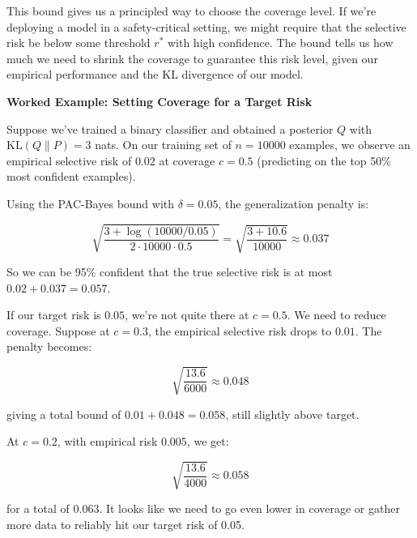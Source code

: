 \vspace{0.3cm}

This bound gives us a principled way to choose the coverage level. If we're deploying a model in a safety-critical setting, we might require that the selective risk be below some threshold $r^*$ with high confidence. The bound tells us how much we need to shrink the coverage to guarantee this risk level, given our empirical performance and the KL divergence of our model.

\vspace{1em}

\begin{examplebox}
\textbf{Worked Example: Setting Coverage for a Target Risk}

Suppose we've trained a binary classifier and obtained a posterior $Q$ with $\text{KL}(Q \| P) = 3$ nats. On our training set of $n=10000$ examples, we observe an empirical selective risk of $0.02$ at coverage $c=0.5$ (predicting on the top 50\% most confident examples).

Using the PAC-Bayes bound with $\delta = 0.05$, the generalization penalty is:

\begin{equation}
\sqrt{\frac{3 + \log(10000/0.05)}{2 \cdot 10000 \cdot 0.5}} = \sqrt{\frac{3 + 10.6}{10000}} \approx 0.037
\end{equation}

So we can be 95\% confident that the true selective risk is at most $0.02 + 0.037 = 0.057$.

If our target risk is $0.05$, we're not quite there at $c=0.5$. We need to reduce coverage. Suppose at $c=0.3$, the empirical selective risk drops to $0.01$. The penalty becomes:

\begin{equation}
\sqrt{\frac{13.6}{6000}} \approx 0.048
\end{equation}

giving a total bound of $0.01 + 0.048 = 0.058$, still slightly above target.

At $c=0.2$, with empirical risk $0.005$, we get:

\begin{equation}
\sqrt{\frac{13.6}{4000}} \approx 0.058
\end{equation}

for a total of $0.063$. It looks like we need to go even lower in coverage or gather more data to reliably hit our target risk of 0.05.
\end{examplebox}

